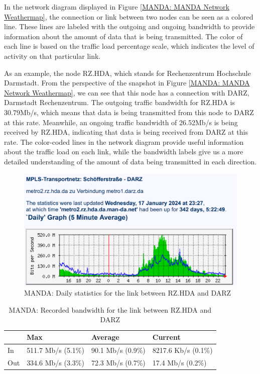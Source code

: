 \documentclass[sigconf,authorversion,nonacm]{acmart}
\begin{document}
In the network diagram displayed in Figure \ref{MANDA: MANDA Network Weathermap}, the connection or link between two nodes can be seen as a colored line. These lines are labeled with the outgoing and ongoing bandwidth to provide information about the amount of data that is being transmitted. The color of each line is based on the traffic load percentage scale, which indicates the level of activity on that particular link. 

As an example, the node RZ.HDA, which stands for Rechenzentrum Hochschule Darmstadt. From the perspective of the snapshot in Figure \ref{MANDA: MANDA Network Weathermap}, we can see that this node has a connection with DARZ, Darmstadt Rechenzentrum. The outgoing traffic bandwidth for RZ.HDA is 30.79Mb/s, which means that data is being transmitted from this node to DARZ at this rate. Meanwhile, an ongoing traffic bandwidth of 26.52Mb/s is being received by RZ.HDA, indicating that data is being received from DARZ at this rate. The color-coded lines in the network diagram provide useful information about the traffic load on each link, while the bandwidth labels give us a more detailed understanding of the amount of data being transmitted in each direction.

\begin{figure}
    \centering
    \includegraphics[width=\linewidth]{MANDA/statistics link darmsdat.PNG}
    \caption{MANDA: Daily statistics for the link between RZ.HDA and DARZ}
    \label{MANDA: Daily statistics of}
\end{figure}

\begin{table}[!ht]
    \centering
    \caption{MANDA: Recorded bandwidth for the link between RZ.HDA and DARZ}
    \label{MANDA: Recorded bandwidth for the link between RZ.HDA and DARZ}
    \begin{tabular}{|l|l|l|l|}
    \hline
        & Max                & Average           & Current             \\ \hline
    In  & 511.7 Mb/s (5.1\%) & 90.1 Mb/s (0.9\%) & 8217.6 Kb/s (0.1\%) \\ \hline
    Out & 334.6 Mb/s (3.3\%) & 72.3 Mb/s (0.7\%) & 17.4 Mb/s (0.2\%) \\ \hline
    \end{tabular}
\end{table}
\end{document}
